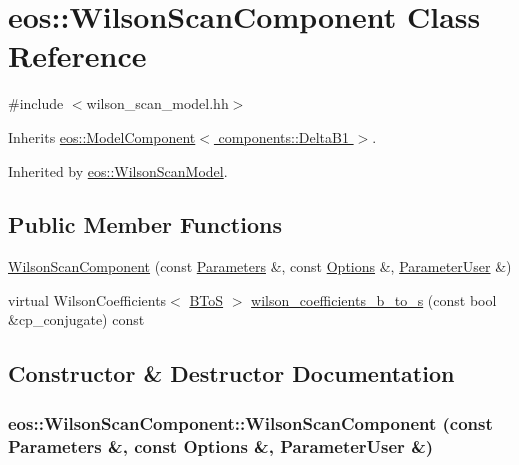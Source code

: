 \hypertarget{classeos_1_1WilsonScanComponent}{
\section{eos::WilsonScanComponent Class Reference}
\label{classeos_1_1WilsonScanComponent}
}


{\ttfamily \#include $<$wilson\_\-scan\_\-model.hh$>$}

Inherits \hyperlink{classeos_1_1ModelComponent_3_01components_1_1DeltaB1_01_4}{eos::ModelComponent$<$ components::DeltaB1 $>$}.

Inherited by \hyperlink{classeos_1_1WilsonScanModel}{eos::WilsonScanModel}.\subsection*{Public Member Functions}
\begin{DoxyCompactItemize}
\item 
\hyperlink{classeos_1_1WilsonScanComponent_a2d1074d1013db8d768843ca0ff03409f}{WilsonScanComponent} (const \hyperlink{classeos_1_1Parameters}{Parameters} \&, const \hyperlink{classeos_1_1Options}{Options} \&, \hyperlink{classeos_1_1ParameterUser}{ParameterUser} \&)
\item 
virtual WilsonCoefficients$<$ \hyperlink{structeos_1_1BToS}{BToS} $>$ \hyperlink{classeos_1_1WilsonScanComponent_afcad159e4ff8fa11d5ea4a5d41f534ad}{wilson\_\-coefficients\_\-b\_\-to\_\-s} (const bool \&cp\_\-conjugate) const 
\end{DoxyCompactItemize}


\subsection{Constructor \& Destructor Documentation}
\hypertarget{classeos_1_1WilsonScanComponent_a2d1074d1013db8d768843ca0ff03409f}{
\subsubsection[{WilsonScanComponent}]{\setlength{\rightskip}{0pt plus 5cm}eos::WilsonScanComponent::WilsonScanComponent (const {\bf Parameters} \&, \/  const {\bf Options} \&, \/  {\bf ParameterUser} \&)}}
\label{classeos_1_1WilsonScanComponent_a2d1074d1013db8d768843ca0ff03409f}


